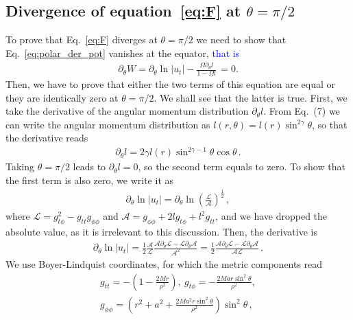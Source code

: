 \documentclass{aa}
\newcommand{\sg}[1]{\textcolor{blue}{#1}}
\begin{document}
\begin{appendix}
\section{Divergence of equation~\eqref{eq:F} at $\theta = \pi/2$}\label{div_partial_W}
To prove that Eq.~\eqref{eq:F} diverges at $\theta = \pi/2$ we need to show that
Eq.~\eqref{eq:polar_der_pot} vanishes at the equator, \sg{that is}
\begin{eqnarray}
\partial_{\theta} W = \partial_{\theta} \ln|u_t| - \frac{\Omega \partial_{\theta}l}{1 - \Omega l}\, = 0.
\end{eqnarray}
Then, we have to prove that either the two terms of this equation are equal or they are identically zero at $\theta = \pi/2$. We shall see that the latter is true.
First, we take the derivative of the angular momentum distribution $\partial_{\theta} l$. From Eq.~(7) we can write the angular momentum distribution as $l(r, \theta) = l(r) \sin^{2\gamma} \theta$, so that the derivative reads
\begin{eqnarray}
\partial_{\theta} l = 2\gamma l(r) \sin^{2\gamma - 1} \theta \cos \theta \,.
\end{eqnarray}
Taking $\theta = \pi/2$ leads to $\partial_{\theta} l = 0$, so the second term equals to zero.
To show that the first term is also zero, we write it as
\begin{eqnarray}
\partial_{\theta} \ln|u_t| = \partial_{\theta} \ln \left(\frac{\mathcal{L}}{\mathcal{A}}\right)^{\frac{1}{2}}\,,
\end{eqnarray}
where $\mathcal{L} = g_{t \phi}^2 - g_{tt} g_{\phi\phi}$ and $\mathcal{A} = g_{\phi\phi} + 2 l g_{t\phi} + l^2g_{tt}$, and we have dropped the absolute value, as it is irrelevant to this discussion. Then, the derivative is
\begin{eqnarray}
\partial_{\theta} \ln|u_t| = \frac{1}{2} \frac{\mathcal{A}}{\mathcal{L}}\frac{\mathcal{A}\partial_{\theta}{\mathcal{L}} - \mathcal{L}\partial_{\theta}\mathcal{A}}{\mathcal{A}^2} = \frac{1}{2} \frac{\mathcal{A}\partial_{\theta}{\mathcal{L}} - \mathcal{L}\partial_{\theta}\mathcal{A}}{\mathcal{A} \mathcal{L}}\,.
\end{eqnarray}
We use Boyer-Lindquist coordinates, for which the metric components read
\begin{eqnarray}
g_{tt} = - \left(1 - \frac{2Mr}{\rho^2}\right), \ g_{t\phi} = -\frac{2Mar\sin^2\theta}{\rho^2},
\nonumber \\
g_{\phi\phi} = \left(r^2 + a^2 + \frac{2Ma^2r\sin^2\theta}{\rho^2}\right) \sin^2 \theta\,,

\end{eqnarray}
\end{appendix}
\end{document}
